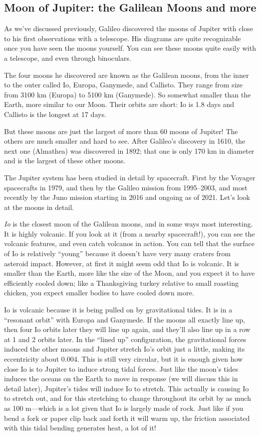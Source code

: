 \documentclass[12pt, preprint]{aastex}
\begin{document}
\subsection{Moon of Jupiter: the Galilean Moons and more}

As we've discussed previously, Galileo discovered the moons of Jupiter
with close to his first observations with a telescope. His diagrams
are quite recognizable once you have seen the moons yourself. You can
see these moons quite easily with a telescope, and even through
binoculars.

The four moons he discovered are known as the Galilean moons, from the
inner to the outer called Io, Europa, Ganymede, and Callisto. They
range from size from 3100 km (Europa) to 5100 km (Ganymede). So
somewhat smaller than the Earth, more similar to our Moon. Their
orbits are short: Io is 1.8 days and Callisto is the longest at 17
days.

But these moons are just the largest of more than 60 moons of Jupiter!
The others are much smaller and hard to see. After Galileo's discovery
in 1610, the next one (Almathea) was discovered in 1892; that one is
only 170 km in diameter and is the largest of these other moons.

The Jupiter system has been studied in detail by spacecraft. First by
the Voyager spacecrafts in 1979, and then by the Galileo mission from
1995--2003, and most recently by the Juno mission starting in 2016 and
ongoing as of 2021. Let's look at the moons in detail.

{\it Io} is the closest moon of the Galilean moons, and in some ways
most interesting. It is highly volcanic. If you look at it (from a
nearby spacecraft!), you can see the volcanic features, and even catch
volcanos in action. You can tell that the surface of Io is relatively
``young'' because it doesn't have very many craters from asteroid
impact. However, at first it might seem odd that Io is volcanic. It is
smaller than the Earth, more like the size of the Moon, and you expect
it to have efficiently cooled down; like a Thanksgiving turkey
relative to small roasting chicken, you expect smaller bodies to have
cooled down more. 

Io is volcanic because it is being pulled on by gravitational
tides. It is in a ``resonant orbit'' with Europa and Ganymede. If the
moons all exactly line up, then four Io orbits later they will line up
again, and they'll also line up in a row at 1 and 2 orbits later. In
the ``lined up'' configuration, the gravitational forces induced the
other moons and Jupiter stretch Io's orbit just a little, making its
eccentricity about 0.004. This is still very circular, but it is
enough given how close Io is to Jupiter to induce strong tidal
forces. Just like the moon's tides induces the oceans on the Earth to
move in response (we will discuss this in detail later), Jupiter's
tides will induce Io to stretch. This actually is causing Io to
stretch out, and for this stretching to change throughout its orbit by
as much as 100 m---which is a lot given that Io is largely made of
rock. Just like if you bend a fork or paper clip back and forth it
will warm up, the friction associated with this tidal bending
generates heat, a lot of it! 
\end{document}
